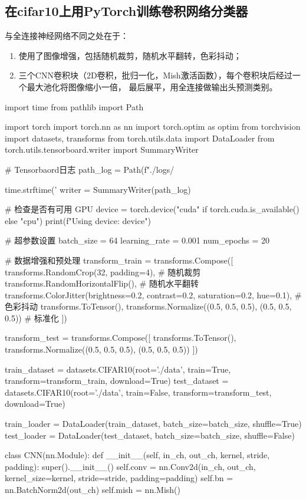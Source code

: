 \documentclass[12pt, a4paper, oneside]{ctexart}
\numberwithin{equation}{section}  %
\begin{document}
\subsection{在cifar10上用PyTorch训练卷积网络分类器}
与全连接神经网络不同之处在于：
\begin{enumerate}
    \item 使用了图像增强，包括随机裁剪，随机水平翻转，色彩抖动；
    \item 三个CNN卷积块（2D卷积，批归一化，Mish激活函数），每个卷积块后经过一个最大池化将图像缩小一倍，
    最后展平，用全连接做输出头预测类别。
\end{enumerate}
\begin{pythoncode}
import time
from pathlib import Path

import torch
import torch.nn as nn
import torch.optim as optim
from torchvision import datasets, transforms
from torch.utils.data import DataLoader
from torch.utils.tensorboard.writer import SummaryWriter

# Tensorbaord日志
path_log = Path(f"./logs/{time.strftime('%
writer = SummaryWriter(path_log)

# 检查是否有可用 GPU
device = torch.device("cuda" if torch.cuda.is_available() else "cpu")
print(f"Using device: {device}")

# 超参数设置
batch_size = 64
learning_rate = 0.001
num_epochs = 20

# 数据增强和预处理
transform_train = transforms.Compose([
  transforms.RandomCrop(32, padding=4),      # 随机裁剪
  transforms.RandomHorizontalFlip(),      # 随机水平翻转
  transforms.ColorJitter(brightness=0.2, contrast=0.2, saturation=0.2, hue=0.1),  # 色彩抖动
  transforms.ToTensor(),
  transforms.Normalize((0.5, 0.5, 0.5), (0.5, 0.5, 0.5))  # 标准化
])

transform_test = transforms.Compose([
  transforms.ToTensor(),
  transforms.Normalize((0.5, 0.5, 0.5), (0.5, 0.5, 0.5))
])

train_dataset = datasets.CIFAR10(root='./data', train=True, transform=transform_train, download=True)
test_dataset = datasets.CIFAR10(root='./data', train=False, transform=transform_test, download=True)

train_loader = DataLoader(train_dataset, batch_size=batch_size, shuffle=True)
test_loader = DataLoader(test_dataset, batch_size=batch_size, shuffle=False)

class CNN(nn.Module):
  def __init__(self, in_ch, out_ch, kernel, stride, padding):
    super().__init__()
    self.conv = nn.Conv2d(in_ch, out_ch, kernel_size=kernel, stride=stride, padding=padding)
    self.bn = nn.BatchNorm2d(out_ch)
    self.mish = nn.Mish()
  
}
\end{pythoncode}
\end{document}

